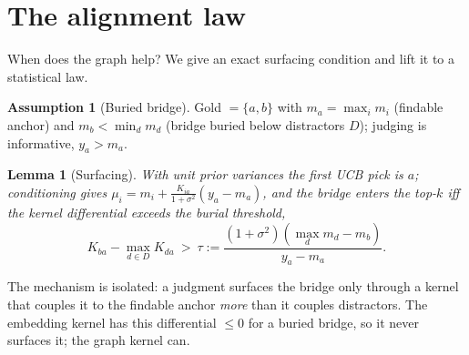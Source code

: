 \documentclass[11pt]{article}
\theoremstyle{plain}\newtheorem{theorem}{Theorem}\newtheorem{lemma}{Lemma}\newtheorem{proposition}{Proposition}
\theoremstyle{definition}\newtheorem{assumption}{Assumption}\newtheorem{remark}{Remark}
\begin{document}
\section{The alignment law}\label{sec:law}
When does the graph help? We give an exact surfacing condition and lift it to a statistical law.
\begin{assumption}[Buried bridge]\label{ass:bridge}
Gold $=\{a,b\}$ with $m_a=\max_i m_i$ (findable anchor) and $m_b<\min_{d}m_d$ (bridge buried below distractors
$D$); judging is informative, $y_a>m_a$.
\end{assumption}
\begin{lemma}[Surfacing]\label{lem:surface}
With unit prior variances the first UCB pick is $a$; conditioning gives $\mu_i=m_i+\frac{K_{ia}}{1+\sigma^2}
(y_a-m_a)$, and the bridge enters the top-$k$ iff the \emph{kernel differential} exceeds the burial threshold,
\[
   K_{ba}-\max_{d\in D}K_{da}\ >\ \tau:=\frac{(1+\sigma^2)(\max_d m_d-m_b)}{y_a-m_a}.
\]
\end{lemma}
The mechanism is isolated: a judgment surfaces the bridge only through a kernel that couples it to the findable
anchor \emph{more} than it couples distractors. The embedding kernel has this differential $\le 0$ for a buried
bridge, so it never surfaces it; the graph kernel can.
\end{document}
